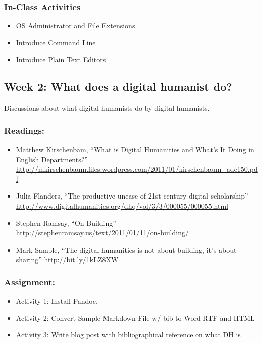 \documentclass[]{article}
\begin{document}
\subsubsection{In-Class Activities}\label{in-class-activities}

\begin{itemize}
\itemsep1pt\parskip0pt
\item
  OS Administrator and File Extensions
\item
  Introduce Command Line
\item
  Introduce Plain Text Editors
\end{itemize}

\subsection{Week 2: What does a digital humanist
do?}\label{week-2-what-does-a-digital-humanist-do}

Discussions about what digital humanists do by digital humanists.

\subsubsection{Readings:}\label{readings-1}

\begin{itemize}
\itemsep1pt\parskip0pt
\item
  Matthew Kirschenbam, ``What is Digital Humanities and What's It Doing
  in English Departments?''
  \url{http://mkirschenbaum.files.wordpress.com/2011/01/kirschenbaum_ade150.pdf}
\item
  Julia Flanders, ``The productive unease of 21st-century digital
  scholarship''
  \url{http://www.digitalhumanities.org/dhq/vol/3/3/000055/000055.html}
\item
  Stephen Ramsay, ``On Building''
  \url{http://stephenramsay.us/text/2011/01/11/on-building/}
\item
  Mark Sample, ``The digital humanities is not about building, it's
  about sharing'' \url{http://bit.ly/1kLZ8XW}
\end{itemize}

\subsubsection{Assignment:}\label{assignment-1}

\begin{itemize}
\itemsep1pt\parskip0pt
\item
  Activity 1: Install Pandoc.
\item
  Activity 2: Convert Sample Markdown File w/ bib to Word RTF and HTML
\item
  Activity 3: Write blog post with bibliographical reference on what DH
  is
\end{itemize}
\end{document}
